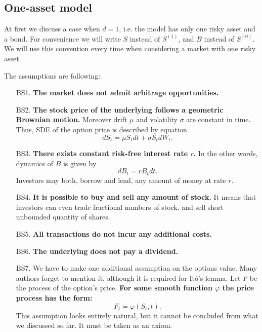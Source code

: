 \documentclass[a4paper,11pt, twoside]{book}
\theoremstyle{definition}
\theoremstyle{remark}
\begin{document}
\subsection{One-asset model}
At first we discuss a case when $d=1$, i.e. the model has only one risky asset and a bond. For convenience we will write $S$ instead of $S^{(1)}$, and $B$ instead of $S^{(0)}$. We will use this convention every time when considering a market with one risky asset.

The assumptions are following:
\begin{enumerate}
  \item[BS1.] \textbf{The market does not admit arbitrage opportunities.}

 \item[BS2.] \textbf{The stock price of the underlying follows a geometric Brownian motion.} Moreover drift $\mu$ and volatility $\sigma$ are constant in time. Thus, SDE of the option price is described by equation
\begin{equation}
 \label{eq:BS_dynamics}
 dS_t = \mu S_t dt + \sigma S_t dW_t. 
\end{equation}
 
  \item[BS3.] \textbf{There exists constant risk-free interest rate $r$.} In the other words, dynamics of $B$ is given by 
\[ dB_t = rB_t dt. \]
Investors may both, borrow and lend, any amount of money at rate $r$.

  \item[BS4.] \textbf{It is possible to buy and sell any amount of stock.} It means that investors can even trade fractional numbers of stock, and sell short unbounded quantity of shares.

  \item[BS5.] \textbf{All transactions do not incur any additional costs.}

  \item[BS6.] \textbf{The underlying does not pay a dividend.}
  
  \item[BS7.] We have to make one additional assumption on the options value. Many authors forget to mention it, although it is required for It\^{o}'s lemma. Let $F$ be the process of the option's price\footnotemark.
  \textbf{For some smooth function $\varphi$ the price process has the form:}
    \begin{equation}
    \label{eq:PriceProcessForm}
    F_t = \varphi(S_t, t).
    \end{equation}
This assumption looks entirely natural, but it cannot be concluded from what we discussed so far. It must be taken as an axiom.
\end{enumerate}
\end{document}
